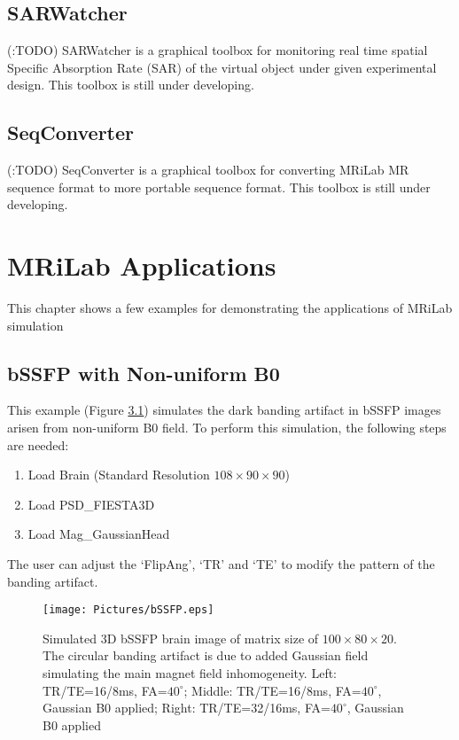 \documentclass{book}%
\begin{document}
\section{SARWatcher}
(:TODO) SARWatcher is a graphical toolbox for monitoring real time spatial Specific Absorption Rate (SAR) of the virtual object under given experimental design. This toolbox is still under developing.

\section{SeqConverter}
(:TODO) SeqConverter is a graphical toolbox for converting MRiLab MR sequence format to more portable sequence format. This toolbox is still under developing.

\chapter{MRiLab Applications}

This chapter shows a few examples for demonstrating the applications of MRiLab simulation

\section{bSSFP with Non-uniform B0}

This example (Figure \ref{fig:bSSFP}) simulates the dark banding artifact in bSSFP images arisen from non-uniform B0 field. To perform this simulation, the following steps are needed:

\begin{enumerate}
	\item Load Brain (Standard Resolution $108 \times 90 \times 90$)
  \item Load PSD\_FIESTA3D
	\item Load Mag\_GaussianHead
\end{enumerate}

The user can adjust the `FlipAng', `TR' and `TE' to modify the pattern of the banding artifact. 

\begin{figure}[htbp]
	\centering
		\texttt{[image: Pictures/bSSFP.eps]}
	\caption{Simulated 3D bSSFP brain image of matrix size of $100 \times 80 \times 20$. The circular banding artifact is due to added Gaussian field simulating the main magnet field inhomogeneity. Left: TR/TE=16/8ms, FA=$40^{\circ}$; Middle: TR/TE=16/8ms, FA=$40^{\circ}$, Gaussian B0 applied; Right: TR/TE=32/16ms, FA=$40^{\circ}$, Gaussian B0 applied}
	\label{fig:bSSFP}
\end{figure}
\end{document}
